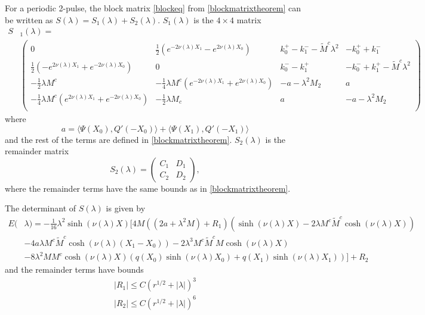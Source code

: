 \documentclass[thesis.tex]{subfiles}
\begin{document}
\begin{corollary}\label{2blockmatrix}
For a periodic 2-pulse, the block matrix \cref{blockeq} from \cref{blockmatrixtheorem} can be written as $S(\lambda) = S_1(\lambda) + S_2(\lambda)$. $S_1(\lambda)$ is the $4 \times 4$ matrix
\begin{align}
S&_1(\lambda) = \\
&\begin{pmatrix}
0 & \frac{1}{2}\left( e^{-2\nu(\lambda)X_1} - e^{2\nu(\lambda)X_0} \right) & k_0^+ - k_1^- -\tilde{M}^c \lambda^2 & -k_0^+ + k_1^- \\
 \frac{1}{2}\left( -e^{2\nu(\lambda)X_1} + e^{-2\nu(\lambda)X_0} \right) & 0 & k_0^- - k_1^+ & -k_0^- + k_1^+-\tilde{M}^c \lambda^2 \\
-\frac{1}{2} \lambda M^c & -\frac{1}{4} \lambda M^c \left( e^{-2\nu(\lambda)X_1} + e^{2\nu(\lambda)X_0} \right) &-a-\lambda^2 M_2 & a \\
-\frac{1}{4} \lambda M^c \left(e^{2\nu(\lambda)X_1} + e^{-2\nu(\lambda)X_0}\right) & -\frac{1}{2} \lambda M_c & a & -a-\lambda^2 M_2 \\
\end{pmatrix}
\end{align}
where
\begin{equation}\label{2pa}
a = \langle \Psi(X_0), Q'(-X_0) \rangle + \langle \Psi(X_1), Q'(-X_1) \rangle
\end{equation}
and the rest of the terms are defined in \cref{blockmatrixtheorem}. $S_2(\lambda)$ is the remainder matrix
\[
S_2(\lambda) = \begin{pmatrix} C_1 & D_1 \\ C_2 & D_2 \end{pmatrix},
\]
where the remainder terms have the same bounds as in \cref{blockmatrixtheorem}.

The determinant of $S(\lambda)$ is given by
\begin{equation}\label{2detBeq}
\begin{aligned}
E(&\lambda) = -\frac{1}{16} \lambda^2 \sinh(\nu(\lambda)X) \Bigg[ 4M \left( (2a + \lambda^2 M) + R_1 \right)\left( \sinh(\nu(\lambda)X) - 2 \lambda M^c \tilde{M}^c \cosh( \nu(\lambda) X) \right) \\
&- 4 a \lambda M^c \tilde{M}^c \cosh(\nu(\lambda)(X_1 - X_0)) - 2 \lambda^3 M^c \tilde{M}^c M \cosh(\nu(\lambda)X) \\
&- 8\lambda^2 M M^c \cosh(\nu(\lambda)X) \left( q(X_0) \sinh(\nu(\lambda)X_0) + q(X_1) \sinh(\nu(\lambda)X_1) \right) 
\Bigg] + R_2
\end{aligned}
\end{equation}
and the remainder terms have bounds
\begin{align*}
|R_1| \leq C(r^{1/2} + |\lambda|)^3 \\
|R_2| \leq C(r^{1/2} + |\lambda|)^6
\end{align*}
\end{corollary}
\end{document}
